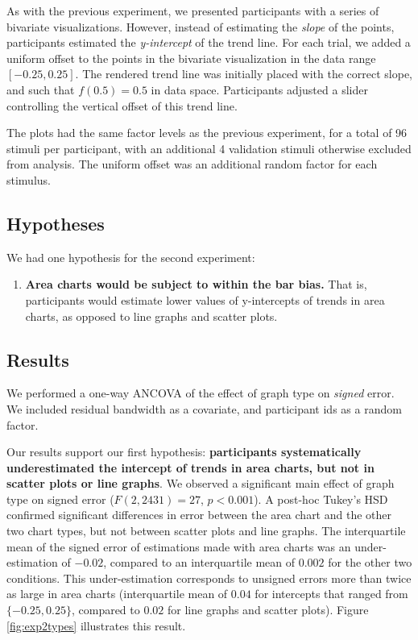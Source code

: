 \documentclass{sigchi}
\begin{document}
As with the previous experiment, we presented participants with a series of bivariate visualizations. However, instead of estimating the \emph{slope} of the points, participants estimated the \emph{y-intercept} of the trend line. For each trial, we added a uniform offset to the points in the bivariate visualization in the data range $[-0.25,0.25]$. The rendered trend line was initially placed with the correct slope, and such that $f(0.5)=0.5$ in data space. Participants adjusted a slider controlling the vertical offset of this trend line.

The plots had the same factor levels as the previous experiment, for a total of 96 stimuli per participant, with an additional 4 validation stimuli otherwise excluded from analysis. The uniform offset was an additional random factor for each stimulus.

\subsection{Hypotheses}

We had one hypothesis for the second experiment:
\begin{enumerate}
	\item \textbf{Area charts would be subject to within the bar bias.} That is, participants would estimate lower values of y-intercepts of trends in area charts, as opposed to line graphs and scatter plots.
\end{enumerate}

\subsection{Results}
We performed a one-way ANCOVA of the effect of graph type on \emph{signed} error. We included residual bandwidth as a covariate, and participant ids as a random factor.

Our results support our first hypothesis: \textbf{participants systematically underestimated the intercept of trends in area charts, but not in scatter plots or line graphs}. We observed a significant main effect of graph type on signed error ($F(2,2431)=27$, $p<0.001$). A post-hoc Tukey's HSD confirmed significant differences in error between the area chart and the other two chart types, but not between scatter plots and line graphs. The interquartile mean of the signed error of estimations made with area charts was an under-estimation of $-0.02$, compared to an interquartile mean of $0.002$ for the other two conditions. This under-estimation corresponds to unsigned errors more than twice as large in area charts (interquartile mean of $0.04$ for intercepts that ranged from $\{-0.25,0.25\}$, compared to $0.02$ for line graphs and scatter plots). Figure \ref{fig:exp2types} illustrates this result.
\end{document}
